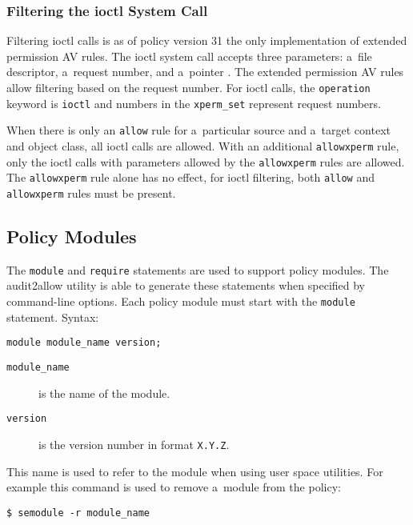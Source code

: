 \subsubsection{Filtering the ioctl System Call}
Filtering ioctl calls is as of policy version 31 the only implementation of
extended permission AV rules. The ioctl system call accepts three parameters:
a~file descriptor, a~request number, and a~pointer \cite{ioctl}. The extended
permission AV rules allow filtering based on the request number. For ioctl
calls, the \texttt{operation} keyword is \texttt{ioctl} and numbers in the
\texttt{xperm\_set} represent request numbers.

When there is only an \texttt{allow} rule for a~particular source and a~target
context and object class, all ioctl calls are allowed. With an additional
\texttt{allowxperm} rule, only the ioctl calls with parameters allowed by the
\texttt{allowxperm} rules are allowed. The \texttt{allowxperm} rule alone has no
effect, for ioctl filtering, both \texttt{allow} and \texttt{allowxperm} rules
must be present.

\subsection{Policy Modules}
\label{modules}

The \texttt{module} and \texttt{require} statements are used to support policy
modules. The audit2allow utility is able to generate these statements when
specified by command-line options. Each policy module must start with the
\texttt{module} statement. Syntax:
\begin{lstlisting}[language=te]
module module_name version;
\end{lstlisting}
\begin{description}
    \item [\texttt{module\_name}] is the name of the module.
    \item [\texttt{version}] is the version number in format \texttt{X.Y.Z}.
\end{description}
This name is used to refer to the module when using user space utilities. For
example this command is used to remove a~module from the policy:
\begin{lstlisting}
$ semodule -r module_name
\end{lstlisting}

